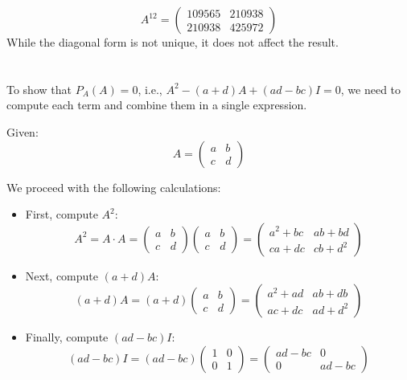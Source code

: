 \documentclass{article}
\begin{document}
\[
    A^{12} = \begin{pmatrix} 109565 & 210938 \\ 210938 & 425972 \end{pmatrix}
\]
While the diagonal form is not unique, it does not affect the result.
\section{}

To show that \( P_A(A) = 0 \), i.e., \( A^2 - (a+d)A + (ad - bc)I = 0 \), we need to compute each term and combine them in a single expression.

Given:
\[
    A = \begin{pmatrix} a & b \\ c & d \end{pmatrix}
\]

We proceed with the following calculations:

\begin{itemize}
    \item First, compute \( A^2 \):
          \[
              A^2 = A \cdot A = \begin{pmatrix} a & b \\ c & d \end{pmatrix} \begin{pmatrix} a & b \\ c & d \end{pmatrix} = \begin{pmatrix} a^2 + bc & ab + bd \\ ca + dc & cb + d^2 \end{pmatrix}
          \]

    \item Next, compute \( (a + d)A \):
          \[
              (a + d)A = (a + d) \begin{pmatrix} a & b \\ c & d \end{pmatrix} = \begin{pmatrix} a^2 + ad & ab + db \\ ac + dc & ad + d^2 \end{pmatrix}
          \]

    \item Finally, compute \( (ad - bc)I \):
          \[
              (ad - bc)I = (ad - bc) \begin{pmatrix} 1 & 0 \\ 0 & 1 \end{pmatrix} = \begin{pmatrix} ad - bc & 0 \\ 0 & ad - bc \end{pmatrix}
          \]
\end{itemize}
\end{document}
